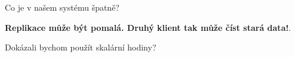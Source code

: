 \documentclass[usenames,dvipsnames,9pt]{beamer}
\begin{document}
\begin{frame}[t]
\begin{center}
%
%
\end{center}
\end{frame}

\begin{frame}

  \begin{center}
    \LARGE Co je v našem systému špatně?
  \end{center}

  \pause\faWarning \hspace{3pt}
    \textbf{Replikace může být pomalá. Druhý klient tak může číst stará data!}.

  \pause
  \vspace{2em}
  \begin{center}
    {\LARGE Dokázali bychom použít skalární hodiny?}

  \end{center}

\end{frame}
\end{document}
